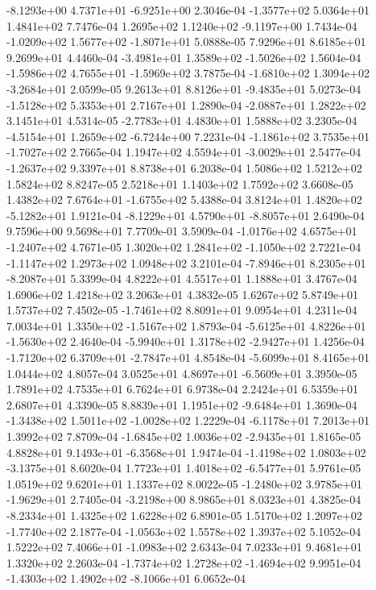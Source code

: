 -8.1293e+00  4.7371e+01 -6.9251e+00  2.3046e-04
-1.3577e+02  5.0364e+01  1.4841e+02  7.7476e-04
 1.2695e+02  1.1240e+02 -9.1197e+00  1.7434e-04
-1.0209e+02  1.5677e+02 -1.8071e+01  5.0888e-05
7.9296e+01 8.6185e+01 9.2699e+01  4.4460e-04
-3.4981e+01  1.3589e+02 -1.5026e+02  1.5604e-04
-1.5986e+02  4.7655e+01 -1.5969e+02  3.7875e-04
-1.6810e+02  1.3094e+02 -3.2684e+01  2.0599e-05
 9.2613e+01  8.8126e+01 -9.4835e+01  5.0273e-04
-1.5128e+02  5.3353e+01  2.7167e+01  1.2890e-04
-2.0887e+01  1.2822e+02  3.1451e+01  4.5314e-05
-2.7783e+01  4.4830e+01  1.5888e+02  3.2305e-04
-4.5154e+01  1.2659e+02 -6.7244e+00  7.2231e-04
-1.1861e+02  3.7535e+01 -1.7027e+02  2.7665e-04
 1.1947e+02  4.5594e+01 -3.0029e+01  2.5477e-04
-1.2637e+02  9.3397e+01  8.8738e+01  6.2038e-04
1.5086e+02 1.5212e+02 1.5824e+02  8.8247e-05
2.5218e+01 1.1403e+02 1.7592e+02  3.6608e-05
 1.4382e+02  7.6764e+01 -1.6755e+02  5.4388e-04
 3.8124e+01  1.4820e+02 -5.1282e+01  1.9121e-04
-8.1229e+01  4.5790e+01 -8.8057e+01  2.6490e-04
9.7596e+00 9.5698e+01 7.7709e-01  3.5909e-04
-1.0176e+02  4.6575e+01 -1.2407e+02  4.7671e-05
 1.3020e+02  1.2841e+02 -1.1050e+02  2.7221e-04
-1.1147e+02  1.2973e+02  1.0948e+02  3.2101e-04
-7.8946e+01  8.2305e+01 -8.2087e+01  5.3399e-04
4.8222e+01 4.5517e+01 1.1888e+01  3.4767e-04
1.6906e+02 1.4218e+02 3.2063e+01  4.3832e-05
1.6267e+02 5.8749e+01 1.5737e+02  7.4502e-05
-1.7461e+02  8.8091e+01  9.0954e+01  4.2311e-04
 7.0034e+01  1.3350e+02 -1.5167e+02  1.8793e-04
-5.6125e+01  4.8226e+01 -1.5630e+02  2.4640e-04
-5.9940e+01  1.3178e+02 -2.9427e+01  1.4256e-04
-1.7120e+02  6.3709e+01 -2.7847e+01  4.8548e-04
-5.6099e+01  8.4165e+01  1.0444e+02  4.8057e-04
 3.0525e+01  4.8697e+01 -6.5609e+01  3.3950e-05
1.7891e+02 4.7535e+01 6.7624e+01  6.9738e-04
2.2424e+01 6.5359e+01 2.6807e+01  4.3390e-05
 8.8839e+01  1.1951e+02 -9.6484e+01  1.3690e-04
-1.3438e+02  1.5011e+02 -1.0028e+02  1.2229e-04
-6.1178e+01  7.2013e+01  1.3992e+02  7.8709e-04
-1.6845e+02  1.0036e+02 -2.9435e+01  1.8165e-05
 4.8828e+01  9.1493e+01 -6.3568e+01  1.9474e-04
-1.4198e+02  1.0803e+02 -3.1375e+01  8.6020e-04
 1.7723e+01  1.4018e+02 -6.5477e+01  5.9761e-05
1.0519e+02 9.6201e+01 1.1337e+02  8.0022e-05
-1.2480e+02  3.9785e+01 -1.9629e+01  2.7405e-04
-3.2198e+00  8.9865e+01  8.0323e+01  4.3825e-04
-8.2334e+01  1.4325e+02  1.6228e+02  6.8901e-05
 1.5170e+02  1.2097e+02 -1.7740e+02  2.1877e-04
-1.0563e+02  1.5578e+02  1.3937e+02  5.1052e-04
 1.5222e+02  7.4066e+01 -1.0983e+02  2.6343e-04
7.0233e+01 9.4681e+01 1.3320e+02  2.2603e-04
-1.7374e+02  1.2728e+02 -1.4694e+02  9.9951e-04
-1.4303e+02  1.4902e+02 -8.1066e+01  6.0652e-04
